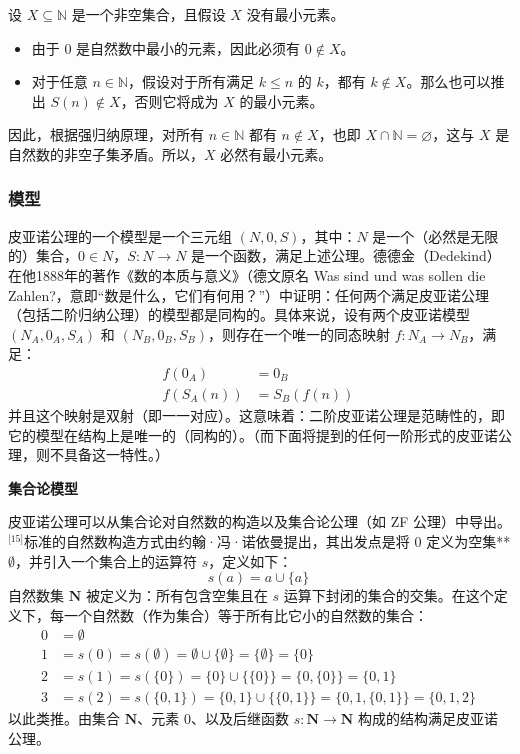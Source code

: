 设 $X \subseteq \mathbb{N}$ 是一个非空集合，且假设 $X$ 没有最小元素。
\begin{itemize}
\item 由于 0 是自然数中最小的元素，因此必须有 $0 \notin X$。
\item 对于任意 $n \in \mathbb{N}$，假设对于所有满足 $k \leq n$ 的 $k$，都有 $k \notin X$。那么也可以推出 $S(n) \notin X$，否则它将成为 $X$ 的最小元素。
\end{itemize}
因此，根据强归纳原理，对所有 $n \in \mathbb{N}$ 都有 $n \notin X$，也即 $X \cap \mathbb{N} = \varnothing$，这与 $X$ 是自然数的非空子集矛盾。所以，$X$ 必然有最小元素。
\subsubsection{模型}
皮亚诺公理的一个模型是一个三元组 $(N, 0, S)$，其中：$N$ 是一个（必然是无限的）集合，$0 \in N$，$S: N \to N$ 是一个函数，满足上述公理。德德金（Dedekind）在他1888年的著作《数的本质与意义》（德文原名 Was sind und was sollen die Zahlen?，意即“数是什么，它们有何用？”）中证明：任何两个满足皮亚诺公理（包括二阶归纳公理）的模型都是同构的。具体来说，设有两个皮亚诺模型 $(N_A, 0_A, S_A)$ 和 $(N_B, 0_B, S_B)$，则存在一个唯一的同态映射 $f: N_A \to N_B$，满足：
$$
\begin{aligned}
f(0_A) &= 0_B \\
f(S_A(n)) &= S_B(f(n))
\end{aligned}~
$$
并且这个映射是双射（即一一对应）。这意味着：二阶皮亚诺公理是范畴性的，即它的模型在结构上是唯一的（同构的）。（而下面将提到的任何一阶形式的皮亚诺公理，则不具备这一特性。）

\textbf{集合论模型}

皮亚诺公理可以从集合论对自然数的构造以及集合论公理（如 ZF 公理）中导出。\(^\text{[15]}\)标准的自然数构造方式由约翰·冯·诺依曼提出，其出发点是将 0 定义为空集** $\emptyset$，并引入一个集合上的运算符 $s$，定义如下：
$$
s(a) = a \cup \{a\}~
$$
自然数集 $\mathbf{N}$ 被定义为：所有包含空集且在 $s$ 运算下封闭的集合的交集。在这个定义下，每一个自然数（作为集合）等于所有比它小的自然数的集合：
$$
\begin{aligned}
0 &= \emptyset \\
1 &= s(0) = s(\emptyset) = \emptyset \cup \{\emptyset\} = \{\emptyset\} = \{0\} \\
2 &= s(1) = s(\{0\}) = \{0\} \cup \{\{0\}\} = \{0, \{0\}\} = \{0, 1\} \\
3 &= s(2) = s(\{0,1\}) = \{0,1\} \cup \{\{0,1\}\} = \{0,1,\{0,1\}\} = \{0,1,2\}
\end{aligned}~
$$
以此类推。由集合 $\mathbf{N}$、元素 $0$、以及后继函数 $s: \mathbf{N} \to \mathbf{N}$ 构成的结构满足皮亚诺公理。

